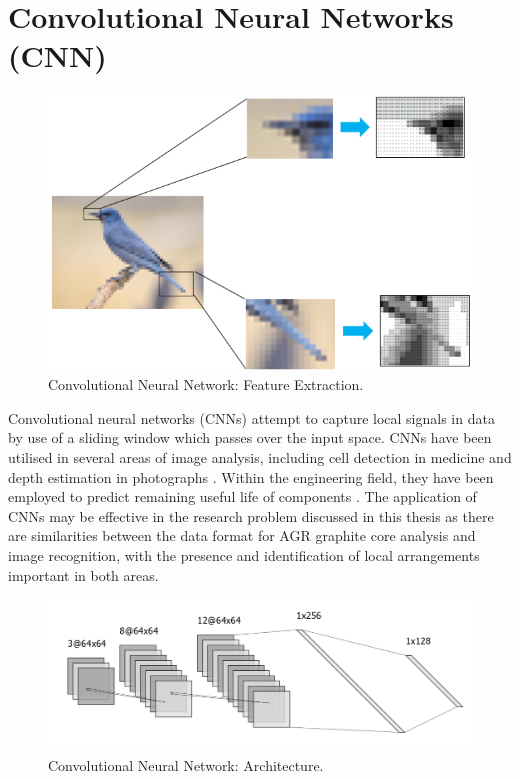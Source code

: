 \section{Convolutional Neural Networks (CNN)} \label{convolution}

\begin{figure}[p]
	\centering
	\includegraphics[scale=0.75]{Figures/cnn_feature.png}
	\caption{Convolutional Neural Network: Feature Extraction.}
	\label{fig:cnn_feature}
\end{figure}

Convolutional neural networks (CNNs) attempt to capture local signals in data by use of a sliding window which passes over the input space. CNNs have been utilised in several areas of image analysis, including cell detection in medicine \cite{xie2015beyond} and depth estimation in photographs \cite{li2015depth}. Within the engineering field, they have been employed to predict remaining useful life of components \cite{babu2016deep}. The application of CNNs may be effective in the research problem discussed in this thesis as there are similarities between the data format for AGR graphite core analysis and image recognition, with the presence and identification of local arrangements important in both areas.
\\

\begin{figure}[p]
	\centering
	\includegraphics[scale=0.45]{Figures/cnn_arch.png}
	\caption{Convolutional Neural Network: Architecture.}
	\label{fig:cnn}
\end{figure}

